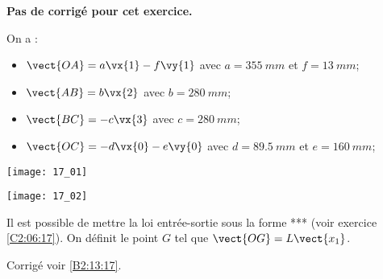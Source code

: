 \normalfalse \difficilefalse \tdifficiletrue
\correctionfalse


\setcounter{numques}{0}
\ifcorrection
\else
\textbf{Pas de corrigé pour cet exercice.}
\fi

\ifprof
\else
On a : 
\begin{itemize}
\item $\vect{OA} = a \vx{1}-f \vy{1}$ avec $a=\SI{355}{mm}$ et $f=\SI{13}{mm}$;
\item $\vect{AB} = b \vx{2}$ avec $b=\SI{280}{mm}$;
\item $\vect{BC} = -c \vx{3}$ avec $c=\SI{280}{mm}$;
\item $\vect{OC} = -d \vx{0}-e\vy{0}$ avec $d=\SI{89,5}{mm}$ et $e=\SI{160}{mm}$;
\end{itemize}

\begin{center}
\texttt{[image: 17\_01]}

\texttt{[image: 17\_02]}
\end{center}
\fi
Il est possible de mettre la loi entrée-sortie sous la forme *** (voir exercice \ref{C2:06:17}).
On définit le point $G$ tel que $\vect{OG}=L\vect{x_1}$.

\ifprof
\else
\fi

\ifprof
\else
\fi

\ifprof
\else
\begin{flushright}
\footnotesize{Corrigé  voir \ref{B2:13:17}.}
\end{flushright}%
\fi